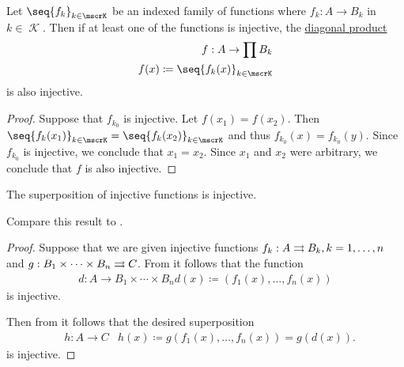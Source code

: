 \begin{lemma}\label{thm:diagonal_product_injectivity}
  Let \( \seq{ f_k }_{k \in \mscrK} \) be an indexed family of functions where \( f_k: A \to B_k \) in \( k \in \mscrK \). Then if at least one of the functions is injective, the \hyperref[def:topological_product]{diagonal product}
  \begin{equation*}
    \begin{aligned}
      f: A \to \prod B_k \\
      f(x) \coloneqq \seq{ f_k(x) }_{k \in \mscrK}
    \end{aligned}
  \end{equation*}
  is also injective.
\end{lemma}
\begin{proof}
  Suppose that \( f_{k_0} \) is injective. Let \( f(x_1) = f(x_2) \). Then \( \seq{ f_k(x_1) }_{k \in \mscrK} = \seq{ f_k(x_2) }_{k \in \mscrK} \) and thus \( f_{k_0}(x) = f_{k_0}(y) \). Since \( f_{k_0} \) is injective, we conclude that \( x_1 = x_2 \). Since \( x_1 \) and \( x_2 \) were arbitrary, we conclude that \( f \) is also injective.
\end{proof}

\begin{proposition}\label{thm:function_superposition_invertibility}
  The superposition of injective functions is injective.

  Compare this result to .
\end{proposition}
\begin{proof}
  Suppose that we are given injective functions \( f_k: A \rightrightarrows B_k, k = 1, \ldots, n \) and \( g: B_1 \times \cdots \times B_n \rightrightarrows C \). From  it follows that the function
  \begin{equation*}
    \begin{aligned}
      d: A \to B_1 \times \cdots \times B_n
      d(x) \coloneqq (f_1(x), \ldots, f_n(x))
    \end{aligned}
  \end{equation*}
  is injective.

  Then from  it follows that the desired superposition
  \begin{equation*}
    \begin{aligned}
      &h: A \to C
      &h(x) \coloneqq g(f_1(x), \ldots, f_n(x)) = g(d(x)).
    \end{aligned}
  \end{equation*}
  is injective.
\end{proof}

